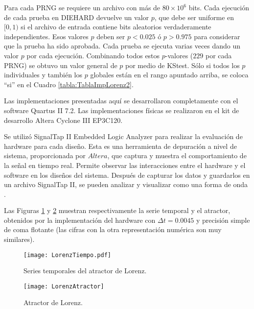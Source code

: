 Para cada PRNG se requiere un archivo con más de $80 \times 10^6$ bits.
Cada ejecución de cada prueba en DIEHARD devuelve un valor $p$, que debe ser uniforme en $[0,1)$ si el archivo de entrada contiene bits aleatorios verdaderamente independientes.
Esos valores $p$ deben ser $p < 0.025$ ó $p > 0.975$ para considerar que la prueba ha sido aprobada.
Cada prueba se ejecuta varias veces dando un valor $p$ por cada ejecución.
Combinando todos estos $p$-valores ($229$ por cada PRNG) se obtuvo un valor general de $p$ por medio de KStest.
Sólo si todos los $p$ individuales y también los $p$ globales están en el rango apuntado arriba, se coloca ``si'' en el Cuadro \ref{tabla:TablaImpLorenz2}.

Las implementaciones presentadas aquí se desarrollaron completamente con el software Quartus II  7.2.
Las implementaciones físicas se realizaron en el kit de desarrollo Altera Cyclone III EP3C120.

Se utilizó SignalTap II Embedded Logic Analyzer para realizar la evaluación de hardware para cada diseño.
Esta es una herramienta de depuración a nivel de sistema, proporcionada por $Altera$, que captura y muestra el comportamiento de la señal en tiempo real.
Permite observar las interacciones entre el hardware y el software en los diseños del sistema.
Después de capturar los datos y guardarlos en un archivo SignalTap II, se pueden analizar y visualizar como una forma de onda \cite{QUARTUS}.

Las Figuras \ref{fig:tiempo} y \ref{fig:atractor} muestran respectivamente la serie temporal y el atractor, obtenidos por la implementación del hardware con $\Delta t = 0.0045$ y precisión simple de coma flotante (las cifras con la otra representación numérica son muy similares).
%
\begin{figure}
	\centering
	\texttt{[image: LorenzTiempo.pdf]}\\
	\caption{Series temporales del atractor de Lorenz.}\label{fig:tiempo}
\end{figure}
%
\begin{figure}
	\centering
	\texttt{[image: LorenzAtractor]}\\
	\caption{Atractor de Lorenz.}\label{fig:atractor}
\end{figure}

